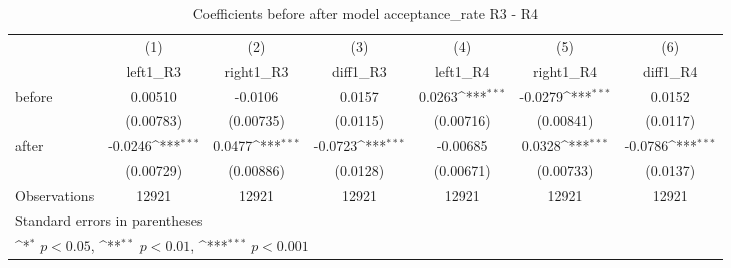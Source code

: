 \begin{table}[htbp]\centering
\def\sym#1{\ifmmode^{#1}\else\(^{#1}\)\fi}
\caption{Coefficients before after model acceptance\_rate R3 - R4}
\begin{tabular}{l*{6}{c}}
\hline\hline
                    &\multicolumn{1}{c}{(1)}&\multicolumn{1}{c}{(2)}&\multicolumn{1}{c}{(3)}&\multicolumn{1}{c}{(4)}&\multicolumn{1}{c}{(5)}&\multicolumn{1}{c}{(6)}\\
                    &\multicolumn{1}{c}{left1\_R3}&\multicolumn{1}{c}{right1\_R3}&\multicolumn{1}{c}{diff1\_R3}&\multicolumn{1}{c}{left1\_R4}&\multicolumn{1}{c}{right1\_R4}&\multicolumn{1}{c}{diff1\_R4}\\
\hline
before              &     0.00510         &     -0.0106         &      0.0157         &      0.0263\sym{***}&     -0.0279\sym{***}&      0.0152         \\
                    &   (0.00783)         &   (0.00735)         &    (0.0115)         &   (0.00716)         &   (0.00841)         &    (0.0117)         \\
[1em]
after               &     -0.0246\sym{***}&      0.0477\sym{***}&     -0.0723\sym{***}&    -0.00685         &      0.0328\sym{***}&     -0.0786\sym{***}\\
                    &   (0.00729)         &   (0.00886)         &    (0.0128)         &   (0.00671)         &   (0.00733)         &    (0.0137)         \\
\hline
Observations        &       12921         &       12921         &       12921         &       12921         &       12921         &       12921         \\
\hline\hline
\multicolumn{7}{l}{\footnotesize Standard errors in parentheses}\\
\multicolumn{7}{l}{\footnotesize \sym{*} \(p<0.05\), \sym{**} \(p<0.01\), \sym{***} \(p<0.001\)}\\
\end{tabular}
\end{table}
